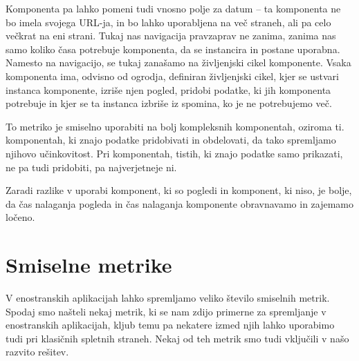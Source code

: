 \documentclass[a4paper, 12pt]{book}
\begin{document}
Komponenta pa lahko pomeni tudi vnosno polje za datum -- ta komponenta ne bo imela svojega URL-ja, in bo lahko uporabljena na več straneh, ali pa celo večkrat na eni strani. Tukaj nas navigacija pravzaprav ne zanima, zanima nas samo koliko časa potrebuje komponenta, da se instancira in postane uporabna. Namesto na navigacijo, se tukaj zanašamo na življenjski cikel komponente. Vsaka komponenta ima, odvisno od ogrodja, definiran življenjski cikel, kjer se ustvari instanca komponente, izriše njen pogled, pridobi podatke, ki jih komponenta potrebuje in kjer se ta instanca izbriše iz spomina, ko je ne potrebujemo več.

To metriko je smiselno uporabiti na bolj kompleksnih komponentah, oziroma ti.  komponentah, ki znajo podatke pridobivati in obdelovati, da tako spremljamo njihovo učinkovitost. Pri  komponentah, tistih, ki znajo podatke samo prikazati, ne pa tudi pridobiti, pa najverjetneje ni.

Zaradi razlike v uporabi komponent, ki so pogledi in komponent, ki niso, je bolje, da čas nalaganja pogleda in čas nalaganja komponente obravnavamo in zajemamo ločeno.

\section{Smiselne metrike}
\label{ch1:sec5}

V enostranskih aplikacijah lahko spremljamo veliko število smiselnih metrik. Spodaj smo našteli nekaj metrik, ki se nam zdijo primerne za spremljanje v enostranskih aplikacijah, kljub temu pa nekatere izmed njih lahko uporabimo tudi pri klasičnih spletnih straneh. Nekaj od teh metrik smo tudi vključili v našo razvito rešitev.
\end{document}

